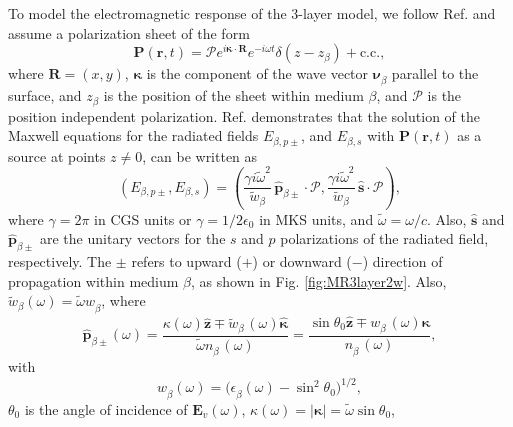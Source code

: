 To model the electromagnetic response of the 3-layer model, we follow Ref.
\cite{mizrahiJOSA88} and assume a polarization sheet of the form
\begin{equation}\label{eq:psheet}
\mathbf{P}(\mathbf{r},t) = \boldsymbol{\mathcal{P}}
e^{i\boldsymbol{\kappa}\cdot\mathbf{R}}e^{-i\omega t}\delta(z - z_{\beta}) 
+ \mathrm{c.c.},
\end{equation}
where $\mathbf{R}=(x,y)$, $\boldsymbol{\kappa}$ is the component of the wave
vector $\boldsymbol{\nu}^{\phantom{a}}_{\beta}$ parallel to the surface, and
$z_{\beta}$ is the position of the sheet within medium $\beta$, and
$\boldsymbol{\mathcal{P}}$ is the position independent polarization. Ref.
\cite{sipeJOSAB87} demonstrates that the solution of the Maxwell equations for
the radiated fields $E_{\beta,p\pm}$, and $E_{\beta,s}$ with
$\mathbf{P}(\mathbf{r},t)$ as a source at points $z\neq 0$, can be written as
\begin{equation}\label{eq:solmaxwell}
(E_{\beta,p\pm},E_{\beta,s}) = 
(\frac{\gamma i\tilde{\omega}^2}{\tilde{w}_{\beta}}
\,\hat{\mathbf{p}}_{\beta\pm}\cdot\boldsymbol{\mathcal{P}},
\frac{\gamma i\tilde{\omega}^2}{\tilde{w}_{\beta}}
\,\hat{\mathbf{s}}\cdot\boldsymbol{\mathcal{P}}),
\end{equation} 
where $\gamma=2\pi$ in CGS units or $\gamma=1/2\epsilon_{0}$ in MKS units, and
$\tilde{\omega}=\omega/c$. Also, $\hat{\mathbf{s}}$ and
$\hat{\mathbf{p}}_{\beta\pm}$ are the unitary vectors for the $s$ and $p$
polarizations of the radiated field, respectively. The $\pm$ refers to upward
($+$) or downward ($-$) direction of propagation within medium $\beta$, as shown
in Fig. \ref{fig:MR3layer2w}. Also,
$\tilde{w}^{\phantom{a}}_{\beta}(\omega)=\tilde{\omega}w^{\phantom{a}}_{\beta}$,
where
\begin{equation}\label{eq:r4}
\hat{\mathbf{p}}^{\phantom{A}}_{\beta\pm}(\omega) =
  \frac{\kappa(\omega)\hat{\mathbf{z}}\mp 
  \tilde{w}^{\phantom{A}}_{\beta}(\omega)\hat{\boldsymbol{\kappa}}} 
  {\tilde{\omega} n^{\phantom{A}}_{\beta}(\omega)}
= \frac{\sin\theta_{0}\hat{\mathbf{z}}\mp 
  w^{\phantom{A}}_{\beta}(\omega)\hat{\boldsymbol{\kappa}}} 
  {n^{\phantom{A}}_{\beta}(\omega)},
\end{equation}
with
\begin{equation}\label{eq:wavevector}
w^{\phantom{a}}_{\beta}(\omega) = 
\big(\epsilon^{\phantom{a}}_{\beta}(\omega) - \sin^{2}\theta_{0}\big)^{1/2},
\end{equation}
$\theta_{0}$ is the angle of incidence of $\mathbf{E}_{v}(\omega)$,
$\kappa(\omega)=\vert\boldsymbol{\kappa}\vert = \tilde{\omega}\sin\theta_{0}$,
